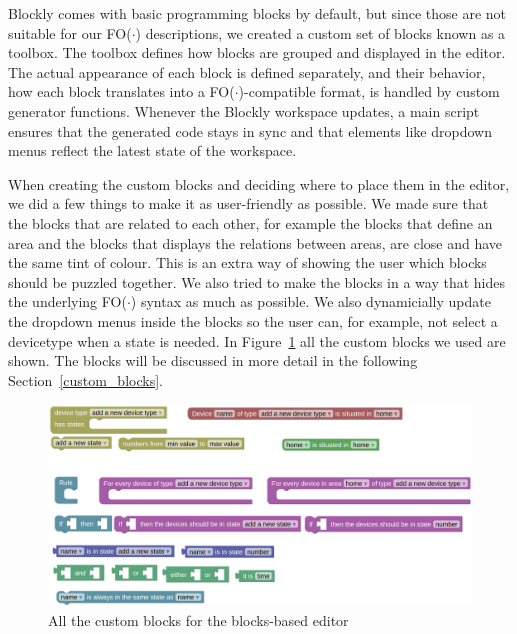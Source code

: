 \documentclass[11pt,a4paper]{report}
\newcommand{\fodot}{FO($\cdot$)\xspace}
\begin{document}
Blockly comes with basic programming blocks by default, but since those are not suitable for our \fodot descriptions, we created a custom set of blocks known as a toolbox. The toolbox defines how blocks are grouped and displayed in the editor. The actual appearance of each block is defined separately, and their behavior, how each block translates into a \fodot-compatible format, is handled by custom generator functions. Whenever the Blockly workspace updates, a main script ensures that the generated code stays in sync and that elements like dropdown menus reflect the latest state of the workspace.

When creating the custom blocks and deciding where to place them in the editor, we did a few things to make it as user-friendly as possible. We made sure that the blocks that are related to each other, for example the blocks that define an area and the blocks that displays the relations between areas, are close and have the same tint of colour. This is an extra way of showing the user which blocks should be puzzled together. We also tried to make the blocks in a way that hides the underlying \fodot syntax as much as possible. We also dynamicially update the dropdown menus inside the blocks so the user can, for example, not select a devicetype when a state is needed. In Figure~\ref{fig:homy} all the custom blocks we used are shown. The blocks will be discussed in more detail in the following Section~\ref{custom_blocks}.

\begin{figure}
    \centering
    \includegraphics[width=1\linewidth]{images/homy.png}
    \caption{All the custom blocks for the blocks-based editor}
    \label{fig:homy}
\end{figure}
\end{document}
